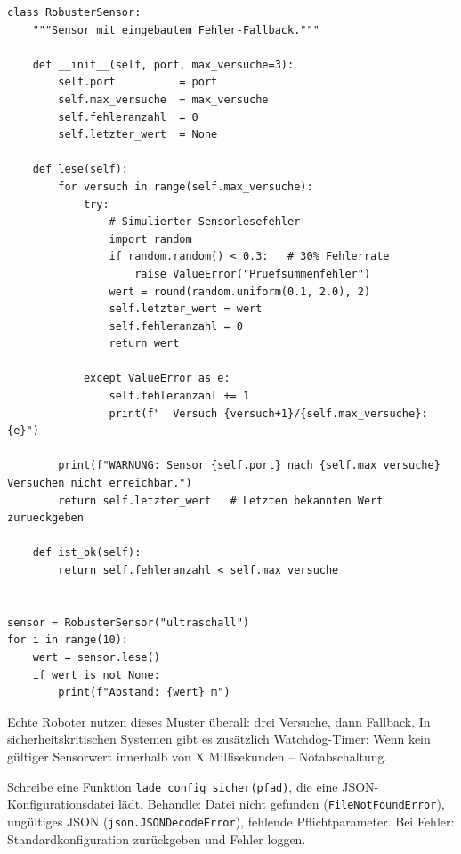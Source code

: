 \begin{lstlisting}
class RobusterSensor:
    """Sensor mit eingebautem Fehler-Fallback."""

    def __init__(self, port, max_versuche=3):
        self.port          = port
        self.max_versuche  = max_versuche
        self.fehleranzahl  = 0
        self.letzter_wert  = None

    def lese(self):
        for versuch in range(self.max_versuche):
            try:
                # Simulierter Sensorlesefehler
                import random
                if random.random() < 0.3:   # 30% Fehlerrate
                    raise ValueError("Pruefsummenfehler")
                wert = round(random.uniform(0.1, 2.0), 2)
                self.letzter_wert = wert
                self.fehleranzahl = 0
                return wert

            except ValueError as e:
                self.fehleranzahl += 1
                print(f"  Versuch {versuch+1}/{self.max_versuche}: {e}")

        print(f"WARNUNG: Sensor {self.port} nach {self.max_versuche} Versuchen nicht erreichbar.")
        return self.letzter_wert   # Letzten bekannten Wert zurueckgeben

    def ist_ok(self):
        return self.fehleranzahl < self.max_versuche


sensor = RobusterSensor("ultraschall")
for i in range(10):
    wert = sensor.lese()
    if wert is not None:
        print(f"Abstand: {wert} m")
\end{lstlisting}

\begin{praxis}
Echte Roboter nutzen dieses Muster überall: drei Versuche, dann Fallback. In sicherheitskritischen Systemen gibt es zusätzlich Watchdog-Timer: Wenn kein gültiger Sensorwert innerhalb von X Millisekunden -- Notabschaltung.
\end{praxis}

\begin{uebung}[title=Projektaufgabe Modul 10: Robuster Datenleser]
Schreibe eine Funktion \texttt{lade\_config\_sicher(pfad)}, die eine JSON-Konfigurationsdatei lädt. Behandle: Datei nicht gefunden (\texttt{FileNotFoundError}), ungültiges JSON (\texttt{json.JSONDecodeError}), fehlende Pflichtparameter. Bei Fehler: Standardkonfiguration zurückgeben und Fehler loggen.
\end{uebung}
